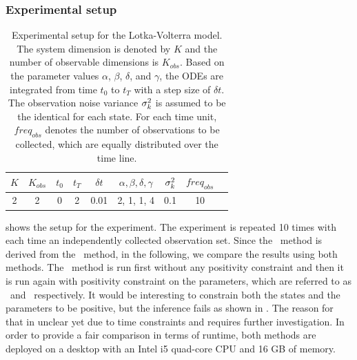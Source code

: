 \subsubsection*{Experimental setup}

\begin{table}
\centering
\caption{Experimental setup for the Lotka-Volterra model. The system dimension is denoted by $K$ and the number of observable dimensions is $K_{obs}$. Based on the parameter values $\alpha$, $\beta$, $\delta$, and $\gamma$, the ODEs are integrated from time $t_0$ to $t_T$ with a step size of $\delta t$. The observation noise variance $\sigma_{k}^2$ is assumed to be the identical for each state. For each time unit, $freq_{obs}$ denotes the number of observations to be collected, which are equally distributed over the time line.}
\label{table-lotka-setup}
\begin{tabular}{|c|c|c|c|c|c|c|c|c|}
\hline
$K$ & $K_{obs}$ & $t_0$ & $t_T$ & $\delta t$ & $\alpha, \beta, \delta, \gamma$ & $\sigma_{k}^2$  & $freq_{obs}$ \\ \hline
2 & 2 & 0 & 2 & 0.01 & 2, 1, 1, 4 & 0.1 & 10 \\ \hline
\end{tabular}
\end{table}

 shows the setup for the experiment.
The experiment is repeated 10 times with each time an independently collected observation set.
Since the \algolpmf\ method is derived from the \algovgmgp\ method, in the following, we compare the results using both methods.
The \algolpmf\ method is run first without any positivity constraint and then it is run again with positivity constraint on the parameters, which are referred to as \algolpmf\ and \algolpmfpos\ respectively.
It would be interesting to constrain both the states and the parameters to be positive, but the inference fails as shown in . 
The reason for that in unclear yet due to time constraints and requires further investigation.
In order to provide a fair comparison in terms of runtime, both methods are deployed on a desktop with an Intel i5 quad-core CPU and 16 GB of memory.

